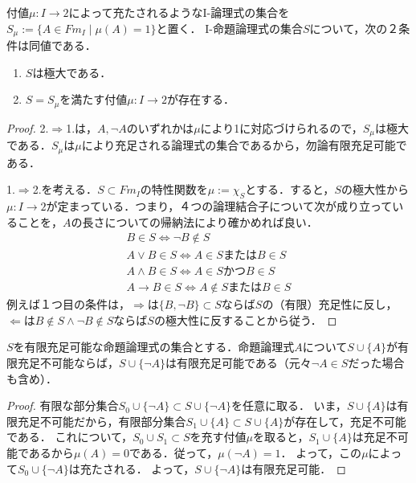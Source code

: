 \documentclass[uplatex, dvipdfmx]{jsreport}
\begin{document}
\begin{proposition}[極大性の特徴付け]\label{prop-characterization-of-maximality}
    付値$\mu:I\to 2$によって充たされるようなI-論理式の集合を$S_\mu:=\{A\in Fm_I\mid \mu(A)=1\}$と置く．
    I-命題論理式の集合$S$について，次の２条件は同値である．
    \begin{enumerate}
        \item $S$は極大である．
        \item $S=S_\mu$を満たす付値$\mu:I\to 2$が存在する．
    \end{enumerate}
\end{proposition}
\begin{proof}
    2.$\Rightarrow$1.は，$A,\lnot A$のいずれかは$\mu$により1に対応づけられるので，$S_\mu$は極大である．$S_\mu$は$\mu$により充足される論理式の集合であるから，勿論有限充足可能である．

    1.$\Rightarrow$2.を考える．$S\subset Fm_I$の特性関数を$\mu:=\chi_S$とする．すると，$S$の極大性から$\mu:I\to 2$が定まっている．つまり，４つの論理結合子について次が成り立っていることを，$A$の長さについての帰納法により確かめれば良い．
    \begin{align*}
        B\in S\Leftrightarrow \lnot B\notin S\\
        A\lor B\in S\Leftrightarrow A\in SまたはB\in S\\
        A\land B\in S\Leftrightarrow A\in SかつB\in S\\
        A\to B\in S\Leftrightarrow A\notin SまたはB\in S
    \end{align*}
    例えば１つ目の条件は，$\Rightarrow$は$\{B,\lnot B\}\subset S$ならば$S$の（有限）充足性に反し，
    $\Leftarrow$は$B\notin S\land \lnot B\notin S$ならば$S$の極大性に反することから従う．
\end{proof}

\begin{lemma}
    $S$を有限充足可能な命題論理式の集合とする．命題論理式$A$について$S\cup\{A\}$が有限充足不可能ならば，$S\cup\{\lnot A\}$は有限充足可能である（元々$\lnot A\in S$だった場合も含め）．
\end{lemma}
\begin{proof}
    有限な部分集合$S_0\cup\{\lnot A\}\subset S\cup\{\lnot A\}$を任意に取る．
    いま，$S\cup\{A\}$は有限充足不可能だから，有限部分集合$S_1\cup\{A\}\subset S\cup\{A\}$が存在して，充足不可能である．
    これについて，$S_0\cup S_1\subset S$を充す付値$\mu$を取ると，$S_1\cup\{A\}$は充足不可能であるから$\mu(A)=0$である．従って，$\mu(\lnot A)=1$．
    よって，この$\mu$によって$S_0\cup\{\lnot A\}$は充たされる．
    よって，$S\cup\{\lnot A\}$は有限充足可能．
\end{proof}
\end{document}

